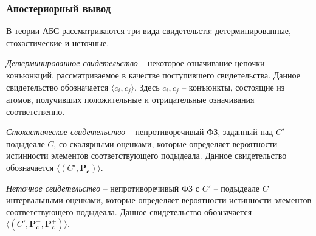         
        \subsubsection{Апостериорный вывод}
            В теории АБС рассматриваются три вида свидетельств: детерминированные, стохастические и неточные.
            

            \begin{Def}
                {\it Детерминированное свидетельство} -- некоторое означивание цепочки конъюнкций, рассматриваемое в качестве поступившего свидетельства. Данное свидетельство обозначается \begin{math} \langle c_{i}, c_{j} \rangle \end{math}. Здесь \begin{math}c_{i}, c_{j}\end{math} -- конъюнкты, состоящие из атомов, получивших положительные и отрицательные означивания соответственно.
            \end{Def}             

            \begin{Def}
                {\it Стохастическое свидетельство} -- непротиворечивый ФЗ, заданный над \begin{math} C'\end{math} -- подыдеале \begin{math} C\end{math}, со скалярными оценками, которые определяет вероятности истинности элементов соответствующего подыдеала. Данное свидетельство обозначается \begin{math} \langle ( C', \mathbf{P_{c}}) \rangle \end{math}.
            \end{Def}           

            \begin{Def}
                {\it Неточное свидетельство} -- непротиворечивый ФЗ с \begin{math} C'\end{math} -- подыдеале \begin{math} C\end{math}  интервальными оценками, которые определяет вероятности истинности элементов соответствующего подыдеала. Данное свидетельство обозначается \begin{math} \langle ( C', \mathbf{P_{c}^{-}},  \mathbf{P_{c}^{+}}) \rangle \end{math}.
            \end{Def}
            
